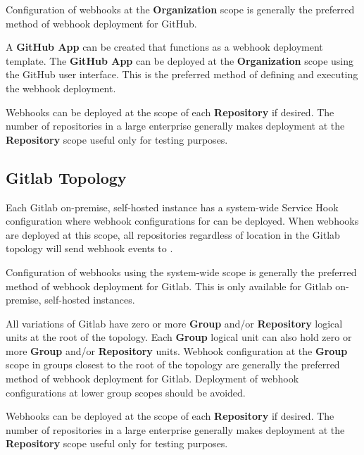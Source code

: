Configuration of webhooks at the \textbf{Organization} scope is generally the preferred
method of webhook deployment for GitHub.

A \textbf{GitHub App} can be created that functions as a webhook deployment template.
The \textbf{GitHub App} can be deployed at the \textbf{Organization} scope using the
GitHub user interface.  This is the preferred method of defining and executing the webhook deployment.

Webhooks can be deployed at the scope of each \textbf{Repository} if desired.  The number of repositories
in a large enterprise generally makes deployment at the \textbf{Repository} scope useful
only for testing purposes.  

\subsection{Gitlab Topology}

Each Gitlab on-premise, self-hosted instance has a system-wide Service Hook configuration where webhook
configurations for \cxoneflow can be deployed.  When webhooks are deployed at this scope, 
all repositories regardless of location in the Gitlab topology will send webhook events to \cxoneflowns. 

Configuration of webhooks using the system-wide scope is generally the preferred
method of webhook deployment for Gitlab.  This is only available for Gitlab on-premise,
self-hosted instances.

All variations of Gitlab have zero or more \textbf{Group} and/or \textbf{Repository} logical units
at the root of the topology.  Each \textbf{Group} logical unit can also hold zero or more
\textbf{Group} and/or \textbf{Repository} units.  Webhook configuration at the \textbf{Group}
scope in groups closest to the root of the topology are generally the preferred
method of webhook deployment for Gitlab.  Deployment of webhook configurations at lower
group scopes should be avoided.

Webhooks can be deployed at the scope of each \textbf{Repository} if desired.  The number of repositories
in a large enterprise generally makes deployment at the \textbf{Repository} scope useful
only for testing purposes.

